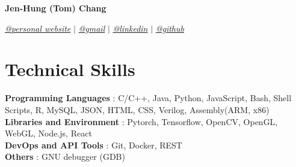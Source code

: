 \documentclass[letterpaper,11pt]{article}
\newcommand{\namespace}{
\vspace{3pt}
}
\newcommand{\sectionspace}{
\vspace{-20pt}
}
\newcommand{\subheadingtitlevspace}{
\vspace{-3pt}
}
\newcommand{\titleItem}[1]{
  \textbf{#1}
}
\begin{document}
\begin{center}
    \textbf{\huge{\center Jen-Hung (Tom) Chang }} \\
    \namespace
    \href{https://personal-website}{{\textit{@personal website}}} $|$
    \href{mailto:tom.jenhungchang@gmail.com}{{\textit{@gmail}}} $|$ 
    \href{https://linkedin.com/in/JenhungChang}{{\textit{@linkedin}}} $|$
    \href{https://github.com/tom89622}{{\textit{@github}}}
    \vspace{-8pt}
\end{center}

    

\section{Technical Skills}
\subheadingtitlevspace
  \begin{itemize}[leftmargin=0.15in, label={}]
    {\item{
      \titleItem{Programming Languages}{: C/C++, Java, Python, JavaScript, Bash, Shell Scripts, R, MySQL, JSON, HTML, CSS, Verilog, Assembly(ARM, x86)} \\
      \titleItem{Libraries and Environment}{: Pytorch, Tensorflow, OpenCV, OpenGL, WebGL, Node.js, React} \\
      \titleItem{DevOps and API Tools}{: Git, Docker, REST} \\
      \titleItem{Others}{: GNU debugger (GDB)}
    }}
  \end{itemize}
\sectionspace
\end{document}
